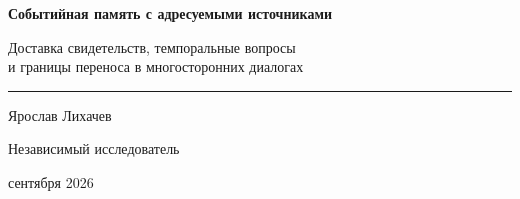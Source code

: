 \documentclass[11pt,a4paper]{article}
\begin{document}
\thispagestyle{empty}
\begin{center}
{\sffamily\bfseries\fontsize{15.5}{19.22}\selectfont
Событийная память с адресуемыми источниками\par}
\vspace{3.4mm}
{\sffamily\color{gray}\fontsize{11}{14}\selectfont
Доставка свидетельств, темпоральные вопросы\\ и границы переноса в многосторонних диалогах\par}
\vspace{5mm}
{\color{gray}\rule{.16\linewidth}{.4pt}}
\vspace{4mm}

{\sffamily\fontsize{10.8}{13}\selectfont Ярослав Лихачев\par}
\vspace{1.2mm}
{\sffamily\color{gray}\fontsize{9.4}{12}\selectfont Независимый исследователь\par}
\vspace{1.2mm}
{\sffamily\color{gray}\fontsize{9}{11} сентября 2026\par}
\end{center}
\vspace{-3mm}
\end{document}
